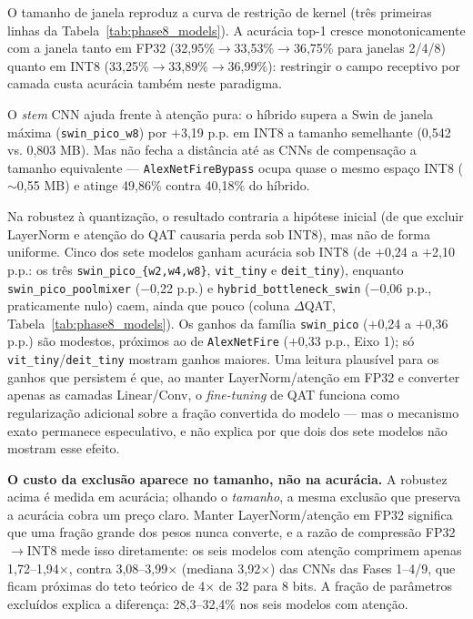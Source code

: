 \documentclass[conference]{IEEEtran}
\begin{document}
O tamanho de janela reproduz a curva de restrição de kernel (três primeiras linhas da
Tabela~\ref{tab:phase8_models}).
A acurácia top-1 cresce
monotonicamente com a janela tanto em FP32 (32,95\%$\to$33,53\%$\to$36,75\% para janelas 2/4/8)
quanto em INT8 (33,25\%$\to$33,89\%$\to$36,99\%): restringir o campo receptivo por camada custa
acurácia também neste paradigma.

O \textit{stem} CNN ajuda frente à atenção pura: o híbrido supera a Swin de janela
máxima (\texttt{swin\_pico\_w8}) por $+$3,19 p.p. em INT8 a tamanho semelhante (0,542 vs.
0,803 MB). Mas não fecha a distância até as CNNs de compensação a tamanho equivalente —
\texttt{AlexNetFireBypass} ocupa quase o mesmo espaço INT8 ($\sim$0,55 MB) e atinge 49,86\% contra
40,18\% do híbrido.

Na robustez à quantização, o resultado contraria a hipótese inicial (de que excluir LayerNorm e
atenção do QAT causaria perda sob INT8), mas não de forma uniforme. Cinco dos sete modelos ganham acurácia sob INT8 (de $+$0,24 a $+$2,10 p.p.: os três
\texttt{swin\_pico\_\{w2,w4,w8\}}, \texttt{vit\_tiny} e \texttt{deit\_tiny}), enquanto
\texttt{swin\_pico\_poolmixer} ($-$0,22 p.p.) e \texttt{hybrid\_bottleneck\_swin} ($-$0,06 p.p.,
praticamente nulo) caem, ainda que pouco (coluna $\Delta$QAT, Tabela~\ref{tab:phase8_models}). Os
ganhos da família \texttt{swin\_pico} ($+$0,24 a $+$0,36 p.p.) são modestos, próximos ao de
\texttt{AlexNetFire} ($+$0,33 p.p., Eixo 1); só \texttt{vit\_tiny}/\texttt{deit\_tiny} mostram
ganhos maiores. Uma leitura plausível para os ganhos que persistem é que, ao manter
LayerNorm/atenção em FP32 e converter apenas as camadas Linear/Conv, o \textit{fine-tuning} de QAT
funciona como regularização adicional sobre a fração convertida do modelo — mas o mecanismo exato
permanece especulativo, e não explica por que dois dos sete modelos não mostram esse efeito.

\textbf{O custo da exclusão aparece no tamanho, não na acurácia.} A robustez acima é medida em
acurácia; olhando o \emph{tamanho}, a mesma exclusão que preserva a acurácia cobra um preço claro.
Manter LayerNorm/atenção em FP32 significa que uma fração grande dos pesos nunca converte, e a
razão de compressão FP32$\to$INT8 mede isso diretamente: os seis modelos com atenção comprimem
apenas 1,72--1,94$\times$, contra 3,08--3,99$\times$ (mediana 3,92$\times$) das CNNs das Fases
1--4/9, que ficam próximas do teto teórico de 4$\times$ de 32 para 8 bits. A fração de parâmetros
excluídos explica a diferença: 28,3--32,4\% nos seis modelos com atenção.
\end{document}
